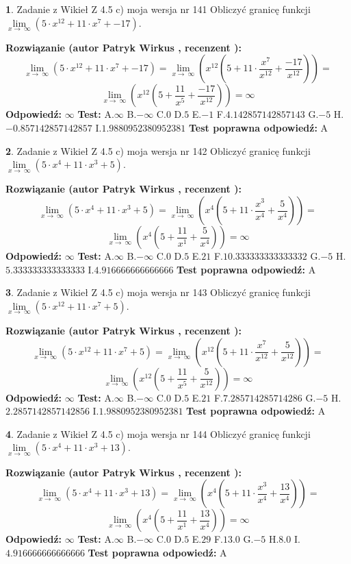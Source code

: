 \documentclass[12pt, a4paper]{article}
\theoremstyle{definition} %
\newtheorem{zad}{}
\newcommand{\zadStart}[1]{\begin{zad}#1\newline}
\newcommand{\zadStop}{\end{zad}}
\newcommand{\rozwStart}[2]{\noindent \textbf{Rozwiązanie (autor #1 , recenzent #2): }\newline}
\newcommand{\rozwStop}{\newline}
\newcommand{\odpStart}{\noindent \textbf{Odpowiedź:}\newline}
\newcommand{\odpStop}{\newline}
\newcommand{\testStart}{\noindent \textbf{Test:}\newline}
\newcommand{\testStop}{\newline}
\newcommand{\kluczStart}{\noindent \textbf{Test poprawna odpowiedź:}\newline}
\newcommand{\kluczStop}{\newline}
\begin{document}
\zadStart{Zadanie z Wikieł Z 4.5 c) moja wersja nr 141}
Obliczyć granicę funkcji  $\lim\limits_{x\to\ \infty}(5 \cdot x^{12}+11 \cdot x^{7}+-17)$.
\zadStop
\rozwStart{Patryk Wirkus}{}
$$\lim\limits_{x\to\ \infty}(5 \cdot x^{12}+11 \cdot x^{7}+-17) = \lim\limits_{x\to\ \infty}(x^{12}(5 +11 \cdot \frac{x^{7}}{x^{12}}+\frac{-17}{x^{12}})) =$$ $$\lim\limits_{x\to\ \infty}(x^{12}(5 +\frac{11}{x^{5}}+\frac{-17}{x^{12}})) =\infty$$
\rozwStop
\odpStart
$\infty$
\odpStop
\testStart
A.$\infty$ B.$-\infty$ C.$0$ D.$5$ E.$-1$
F.$4.142857142857143$ G.$-5$
H.$-0.857142857142857$
I.$1.9880952380952381$
\testStop
\kluczStart
A
\kluczStop



\zadStart{Zadanie z Wikieł Z 4.5 c) moja wersja nr 142}
Obliczyć granicę funkcji  $\lim\limits_{x\to\ \infty}(5 \cdot x^{4}+11 \cdot x^{3}+5)$.
\zadStop
\rozwStart{Patryk Wirkus}{}
$$\lim\limits_{x\to\ \infty}(5 \cdot x^{4}+11 \cdot x^{3}+5) = \lim\limits_{x\to\ \infty}(x^{4}(5 +11 \cdot \frac{x^{3}}{x^{4}}+\frac{5}{x^{4}})) =$$ $$\lim\limits_{x\to\ \infty}(x^{4}(5 +\frac{11}{x^{1}}+\frac{5}{x^{4}})) =\infty$$
\rozwStop
\odpStart
$\infty$
\odpStop
\testStart
A.$\infty$ B.$-\infty$ C.$0$ D.$5$ E.$21$
F.$10.333333333333332$ G.$-5$
H.$5.333333333333333$
I.$4.916666666666666$
\testStop
\kluczStart
A
\kluczStop



\zadStart{Zadanie z Wikieł Z 4.5 c) moja wersja nr 143}
Obliczyć granicę funkcji  $\lim\limits_{x\to\ \infty}(5 \cdot x^{12}+11 \cdot x^{7}+5)$.
\zadStop
\rozwStart{Patryk Wirkus}{}
$$\lim\limits_{x\to\ \infty}(5 \cdot x^{12}+11 \cdot x^{7}+5) = \lim\limits_{x\to\ \infty}(x^{12}(5 +11 \cdot \frac{x^{7}}{x^{12}}+\frac{5}{x^{12}})) =$$ $$\lim\limits_{x\to\ \infty}(x^{12}(5 +\frac{11}{x^{5}}+\frac{5}{x^{12}})) =\infty$$
\rozwStop
\odpStart
$\infty$
\odpStop
\testStart
A.$\infty$ B.$-\infty$ C.$0$ D.$5$ E.$21$
F.$7.285714285714286$ G.$-5$
H.$2.2857142857142856$
I.$1.9880952380952381$
\testStop
\kluczStart
A
\kluczStop



\zadStart{Zadanie z Wikieł Z 4.5 c) moja wersja nr 144}
Obliczyć granicę funkcji  $\lim\limits_{x\to\ \infty}(5 \cdot x^{4}+11 \cdot x^{3}+13)$.
\zadStop
\rozwStart{Patryk Wirkus}{}
$$\lim\limits_{x\to\ \infty}(5 \cdot x^{4}+11 \cdot x^{3}+13) = \lim\limits_{x\to\ \infty}(x^{4}(5 +11 \cdot \frac{x^{3}}{x^{4}}+\frac{13}{x^{4}})) =$$ $$\lim\limits_{x\to\ \infty}(x^{4}(5 +\frac{11}{x^{1}}+\frac{13}{x^{4}})) =\infty$$
\rozwStop
\odpStart
$\infty$
\odpStop
\testStart
A.$\infty$ B.$-\infty$ C.$0$ D.$5$ E.$29$
F.$13.0$ G.$-5$
H.$8.0$
I.$4.916666666666666$
\testStop
\kluczStart
A
\kluczStop
\end{document}

